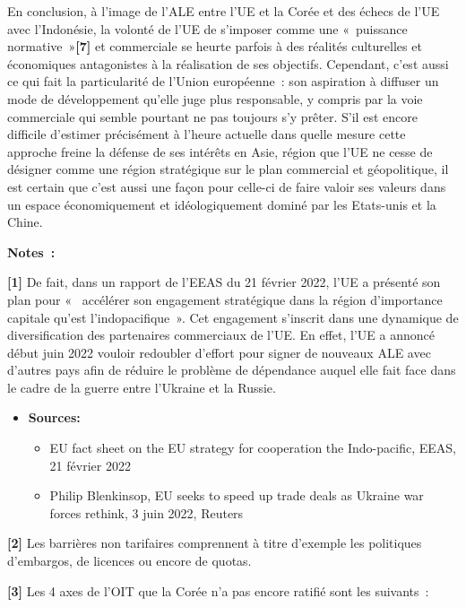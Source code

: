 \documentclass[11pt,a4paper]{article}
\begin{document}
En conclusion, à l'image de l'ALE entre l'UE et la Corée et des échecs de l'UE avec l'Indonésie, la volonté de l'UE de s'imposer comme une «~puissance normative~»\textbf{{[}7{]}} et commerciale se heurte parfois à des réalités culturelles et économiques antagonistes à la réalisation de ses objectifs. Cependant, c'est aussi ce qui fait la particularité de l'Union européenne~: son aspiration à diffuser un mode de développement qu'elle juge plus responsable, y compris par la voie commerciale qui semble pourtant ne pas toujours s'y prêter. S'il est encore difficile d'estimer précisément à l'heure actuelle dans quelle mesure cette approche freine la défense de ses intérêts en Asie, région que l'UE ne cesse de désigner comme une région stratégique sur le plan commercial et géopolitique, il est certain que c'est aussi une façon pour celle-ci de faire valoir ses valeurs dans un espace économiquement et idéologiquement dominé par les Etats-unis et la Chine.

\textbf{Notes~:}

\textbf{{[}1{]}} De fait, dans un rapport de l'EEAS du 21 février 2022, l'UE a présenté son plan pour «~ accélérer son engagement stratégique dans la région d'importance capitale qu'est l'indopacifique~». Cet engagement s'inscrit dans une dynamique de diversification des partenaires commerciaux de l'UE. En effet, l'UE a annoncé début juin 2022 vouloir redoubler d'effort pour signer de nouveaux ALE avec d'autres pays afin de réduire le problème de dépendance auquel elle fait face dans le cadre de la guerre entre l'Ukraine et la Russie.

\begin{itemize}
\item
  \textbf{Sources:}

  \begin{itemize}

  \item
    EU fact sheet on the EU strategy for cooperation the Indo-pacific, EEAS, 21 février 2022
  \item
    Philip Blenkinsop, EU seeks to speed up trade deals as Ukraine war forces rethink, 3 juin 2022, Reuters
  \end{itemize}
\end{itemize}

\textbf{{[}2{]}} Les barrières non tarifaires comprennent à titre d'exemple les politiques d'embargos, de licences ou encore de quotas.

\textbf{{[}3{]}} Les 4 axes de l'OIT que la Corée n'a pas encore ratifié sont les suivants~:
\end{document}
